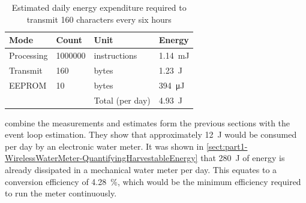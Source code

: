     \begin{table}
      \centering
      \begin{tabular}{|l|l|l|l|}
        \hline
        Mode & Count & Unit & Energy \\ \hline
        Processing & 1000000 & instructions & \SI{1.14}{\milli\joule} \\
        Transmit & 160 & bytes & \SI{1.23}{\joule} \\
        EEPROM & 10 & bytes & \SI{394}{\micro\joule} \\ \hline \hline
        &&Total (per day) & \SI{4.93}{\joule} \\ \hline
      \end{tabular}
      \caption{\label{tab:EnergyBudget-Transmission}Estimated daily energy expenditure required to transmit 160 characters every six hours}
    \end{table}

     combine the measurements and estimates form the previous sections with the event loop estimation.
    They show that approximately \SI{12}{\joule} would be consumed per day by an electronic water meter.
    It was shown in \cref{sect:part1-WirelessWaterMeter-QuantifyingHarvestableEnergy} that \SI{280}{\joule} of energy is already dissipated in a mechanical water meter per day.
    This equates to a conversion efficiency of \SI{4.28}{\percent}, which would be the minimum efficiency required to run the meter continuously.
